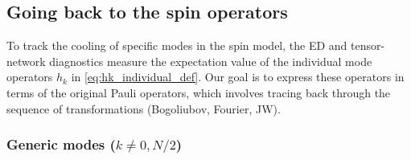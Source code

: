 \documentclass[aps,prx,twocolumn,superscriptaddress,nofootinbib,nolongbibliography,nobalancelastpage,10pt,floatfix]{revtex4-2}
\begin{document}
\subsection{Going back to the spin operators}

To track the cooling of specific modes in the spin model, the ED and tensor-network diagnostics measure the expectation value of the individual mode operators $h_k$ in \cref{eq:hk_individual_def}. Our goal is to express these operators in terms of the original Pauli operators, which involves tracing back through the sequence of transformations (Bogoliubov, Fourier, JW).

\subsubsection{Generic modes ($k \neq 0, N/2$)}
\end{document}
